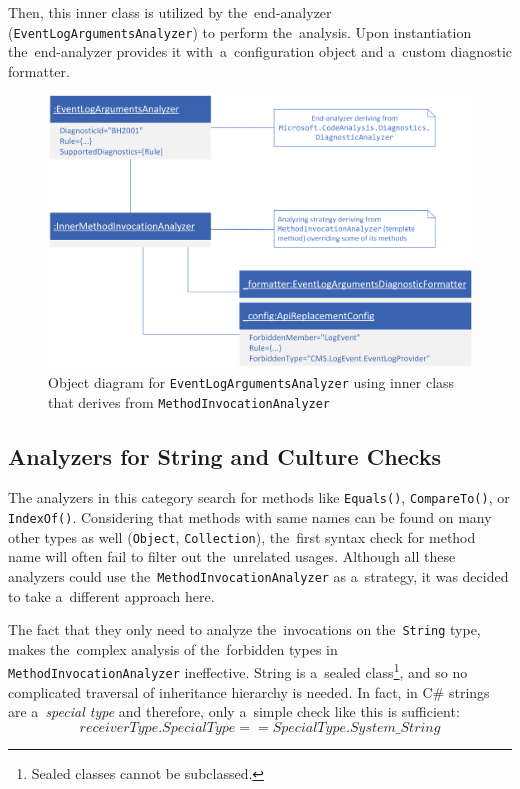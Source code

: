 \documentclass[
  digital, %
  table,   %
  lof,     %
  lot,     %
  oneside,
]{fithesis3}
\begin{document}
Then, this inner class is utilized by the~end-analyzer (\texttt{EventLogArgumentsAnalyzer}) to perform the~analysis. Upon instantiation the~end-analyzer provides it with~a~configuration object and a~custom diagnostic formatter. 
\begin{figure}[h!]
		\centering
			\includegraphics[scale=0.75]{img/uml/method-invocation-analyzer-object-diagram}
		\caption{Object diagram for \texttt{EventLogArgumentsAnalyzer} using inner class that derives from \texttt{MethodInvocationAnalyzer}}
		\label{fig:uml-method-invocation-analyzer-object-diagram}
\end{figure}

\subsection{Analyzers for String and Culture Checks}
The analyzers in this category search for methods like \texttt{Equals()}, \texttt{CompareTo()}, or \texttt{IndexOf()}. Considering that methods with same names can be found on many other types as well (\texttt{Object}, \texttt{Collection}), the~first syntax check for method name will often fail to filter out the~unrelated usages. Although all these analyzers could use the~\texttt{MethodInvocationAnalyzer} as a~strategy, it was decided to take a~different approach here. 

The fact that they only need to analyze the~invocations on the~\texttt{String} type, makes the~complex analysis of the~forbidden types in \texttt{MethodInvocationAnalyzer} ineffective. String is a~sealed class\footnote{Sealed classes cannot be subclassed.}, and so no complicated traversal of inheritance hierarchy is needed. In fact, in C\# strings are a~\textit{special type} and therefore, only a~simple check like this is sufficient:
$$
receiverType.SpecialType == SpecialType.System\_String
$$
\end{document}
